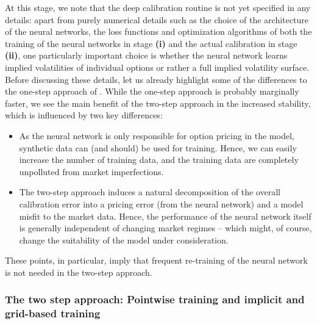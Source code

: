 \documentclass{article}
\theoremstyle{remark}
\begin{document}
At this stage, we note that the deep calibration routine is not yet specified
in any details: apart from purely numerical details such as the choice of the
architecture of the neural networks, the loss functions and optimization
algorithms of both the training of the neural networks in stage \textbf{(i)}
and the actual calibration in stage \textbf{(ii)}, one particularly important
choice is whether the neural network learns implied volatilities of individual
options or rather a full implied volatility surface. Before discussing these
details, let us already highlight some of the differences to the one-step
approach of \cite{Hernandez}. While the one-step approach is probably marginally
faster, we see the main benefit of the two-step approach in the increased
stability, which is influenced by two key differences:
\begin{itemize}
\item As the neural network is only responsible for option pricing in the
  model, synthetic data can (and should) be used for training. Hence, we can
  easily increase the number of training data, and the training data are
  completely unpolluted from market imperfections.
\item The two-step approach induces a natural decomposition of the overall
  calibration error into a pricing error (from the neural network) and a model
  misfit to the market data. Hence, the performance of the neural network
  itself is generally independent of changing market regimes -- which might,
  of course, change the suitability of the model under consideration.
\end{itemize}
These points, in particular, imply that frequent re-training of the neural
network is not needed in the two-step approach.




\subsubsection{The two step approach: Pointwise training and implicit and grid-based training}
\end{document}
